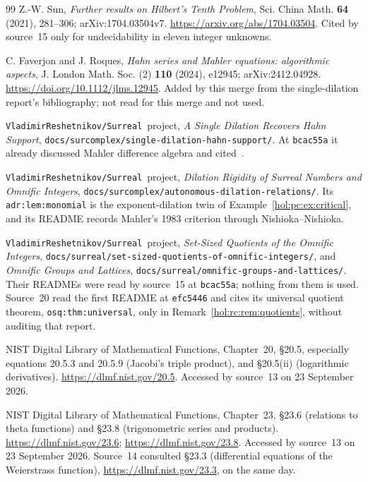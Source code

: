 \documentclass[11pt]{article}
\numberwithin{equation}{section}
\theoremstyle{definition}
\theoremstyle{remark}
\newcommand{\repo}{\texttt{VladimirReshetnikov/Surreal}}
\begin{document}
\begin{thebibliography}{99}
Z.-W. Sun, \emph{Further results on Hilbert's Tenth Problem}, Sci. China
Math. \textbf{64} (2021), 281--306; arXiv:1704.03504v7.
\url{https://arxiv.org/abs/1704.03504}.
Cited by source~15 only for undecidability in eleven integer unknowns.

C. Faverjon and J. Roques, \emph{Hahn series and Mahler equations: algorithmic
aspects}, J. London Math. Soc. (2) \textbf{110} (2024), e12945;
arXiv:2412.04928. \url{https://doi.org/10.1112/jlms.12945}.
Added by this merge from the single-dilation report's bibliography; not read
for this merge and not used.

\repo\ project, \emph{A Single Dilation Recovers Hahn Support},
\texttt{docs/surcomplex/single-dilation-hahn-support/}. At \texttt{bcac55a} it
already discussed Mahler difference algebra and cited~\cite{faverjonroques}.

\repo\ project, \emph{Dilation Rigidity of Surreal Numbers and Omnific
Integers}, \texttt{docs/surcomplex/autonomous-dilation-relations/}. Its
\texttt{adr:lem:monomial} is the exponent-dilation twin of
Example~\ref{hol:pc:ex:critical}, and its README records Mahler's 1983
criterion through Nishioka--Nishioka.

\repo\ project, \emph{Set-Sized Quotients of the Omnific Integers},
\texttt{docs/surreal/set-sized-quotients-of-omnific-integers/}, and
\emph{Omnific Groups and Lattices},
\texttt{docs/surreal/omnific-groups-and-lattices/}.
Their READMEs were read by source~15 at \texttt{bcac55a}; nothing from them is
used. Source~20 read the first README at \texttt{efc5446} and cites its
universal quotient theorem, \texttt{osq:thm:universal}, only in
Remark~\ref{hol:rc:rem:quotients}, without auditing that report.

NIST Digital Library of Mathematical Functions, Chapter~20, \S20.5,
especially equations 20.5.3 and 20.5.9 (Jacobi's triple product), and
\S20.5(ii) (logarithmic derivatives).
\url{https://dlmf.nist.gov/20.5}. Accessed by source~13 on 23 September 2026.

NIST Digital Library of Mathematical Functions, Chapter~23, \S23.6
(relations to theta functions) and \S23.8 (trigonometric series and
products).
\url{https://dlmf.nist.gov/23.6}; \url{https://dlmf.nist.gov/23.8}. Accessed
by source~13 on 23 September 2026. Source~14 consulted \S23.3 (differential
equations of the Weierstrass function), \url{https://dlmf.nist.gov/23.3}, on
the same day.


\end{thebibliography}
\end{document}
